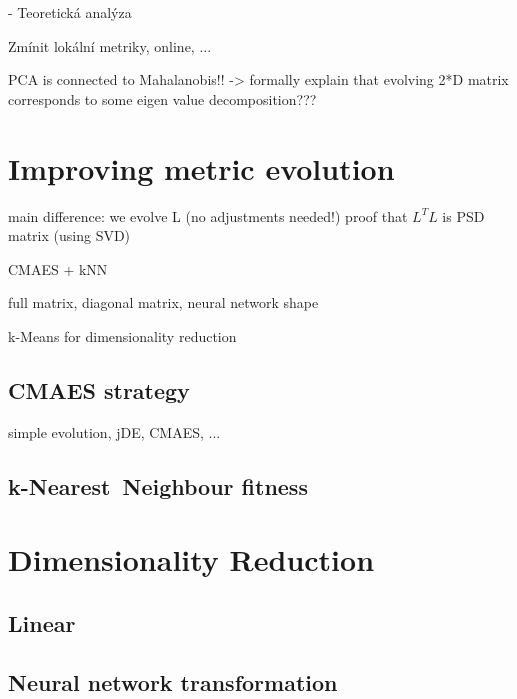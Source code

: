 \documentclass[12pt,a4paper]{report}
\begin{document}
- Teoretická analýza

Zmínit lokální metriky, online, ...

PCA is connected to Mahalanobis!!
->
formally explain that evolving 2*D matrix corresponds to some eigen value decomposition???


\chapter{Improving metric evolution} \label{chap:our-method}

main difference: we evolve L (no adjustments needed!)
proof that $L^TL$ is PSD matrix  (using SVD)

CMAES + kNN

full matrix, diagonal matrix, neural network shape

k-Means for dimensionality reduction

\section{CMAES strategy}

simple evolution, jDE, CMAES, ...

\section{k-Nearest~Neighbour fitness}


\chapter{Dimensionality Reduction} \label{chap:dim:reduction}

\section{Linear}

\section{Neural network transformation}
\end{document}
